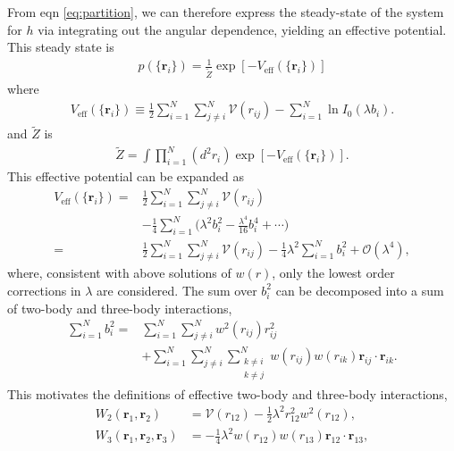\documentclass[twocolumn,amsmath,amssymb,aps]{revtex4-1}%
\begin{document}
From eqn \ref{eq:partition}, we can therefore express the steady-state of
the system for $h$ via integrating out the angular dependence, yielding an
effective potential. This steady state is
\begin{align}
  p(\{\bm{r}_i\})=\frac{1}{\tilde{Z}}\exp[-V_{\mathrm{eff}}
  (\{\bm{r}_i\})]
\end{align}
where
\begin{align}
  V_{\mathrm{eff}}(\{\bm{r}_i\})
  \equiv\frac{1}{2}\sum_{i=1}^N\sum_{j\neq i}^N
  \mathcal{V}(r_{ij})-\sum_{i=1}^N\ln I_0(\lambda b_i).
\end{align}
and $\tilde{Z}$ is 
\begin{align}
  \tilde{Z}=\int\prod_{i=1}^N(d^2r_i)\exp[-V_{\mathrm{eff}}(\{\bm{r}_i\})].
\end{align}
This effective potential can be expanded as
\begin{align}
  V_{\mathrm{eff}}(\{\bm{r}_i\})
  =&\frac{1}{2}\sum_{i=1}^N\sum_{j\neq i}^N\mathcal{V}(r_{ij})\nonumber\\
   &-\frac{1}{4}\sum_{i=1}^N\bigg(\lambda^2b_i^2
     -\frac{\lambda^4}{16}b_i^4+\cdots\bigg)
     \nonumber\\
  =&\frac{1}{2}\sum_{i=1}^N\sum_{j\neq i}^N\mathcal{V}(r_{ij})
     -\frac{1}{4}\lambda^2\sum_{i=1}^Nb_i^2+\mathcal{O}(\lambda^4),
\end{align}
where, consistent with above solutions of $w(r)$, only the lowest order
corrections in $\lambda$ are considered. The sum over $b_i^2$ can be
decomposed into a sum of two-body and three-body interactions,
\begin{align}
  \sum_{i=1}^Nb_i^2
  =&\sum_{i=1}^N\sum_{j\neq i}^Nw^2(r_{ij})r_{ij}^2\nonumber\\
   &+\sum_{i=1}^N\sum_{j\neq i}^N\sum_{\substack{k\neq i \\ k\neq j}}^N
  w(r_{ij})w(r_{ik})\bm{r}_{ij}\cdot\bm{r}_{ik}.
\end{align}
This motivates the definitions of effective two-body and three-body
interactions,
\begin{subequations}
  \label{eqs:2and3body}
  \begin{align}
    W_2(\bm{r}_1,\bm{r}_2)
    &= \mathcal{V}(r_{12})
      -\frac{1}{2}\lambda^2 r_{12}^2w^2(r_{12}),\label{eq:2body}\\
    W_3(\bm{r}_1,\bm{r}_2,\bm{r}_3)
    &= -\frac{1}{4}\lambda^2w(r_{12})w(r_{13})\bm{r}_{12}\cdot\bm{r}_{13},
      \label{eq:3body}
  \end{align}
\end{subequations}
\end{document}
